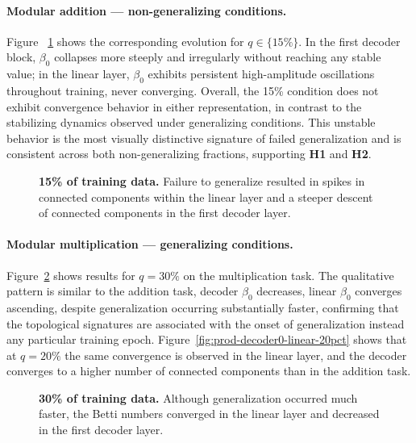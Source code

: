 \paragraph{Modular addition — non-generalizing conditions.}
Figure ~\ref{fig:sum-decoder0-linear-15pct} shows the corresponding evolution for $q \in \{15\%\}$. In the first decoder block, $\beta_0$ collapses more steeply and irregularly without reaching any stable value; in the linear layer, $\beta_0$ exhibits persistent high-amplitude oscillations throughout training, never converging. Overall, the 15\% condition does not exhibit convergence behavior in either representation, in contrast to the stabilizing dynamics observed under generalizing conditions. This unstable behavior is the most visually distinctive signature of failed generalization and is consistent across both non-generalizing fractions, supporting \textbf{H1} and \textbf{H2}.


\begin{figure}
	\centering
	
	
	\caption[15\% of training data.]{\textbf{15\% of training data.} Failure to generalize resulted in spikes in connected components within the linear layer and a steeper descent of connected components in the first decoder layer.}
	\label{fig:sum-decoder0-linear-15pct}
\end{figure}

\paragraph{Modular multiplication — generalizing conditions.}
Figure~\ref{fig:prod-decoder0-linear-30pct} shows results for $q = 30\%$ on the multiplication task. The qualitative pattern is similar to the addition task,  decoder $\beta_0$ decreases, linear $\beta_0$ converges ascending, despite generalization occurring substantially faster, confirming that the topological signatures are associated with the onset of generalization instead any particular training epoch. Figure~\ref{fig:prod-decoder0-linear-20pct} shows that at $q = 20\%$ the same convergence is observed in the linear layer, and the decoder converges to a higher number of connected components than in the addition task.

\begin{figure}
	\centering
	
	
	\caption[30\% of training data (Modular Product).]{\textbf{30\% of training data.} Although generalization occurred much faster, the Betti numbers converged in the linear layer and decreased in the first decoder layer.}
	\label{fig:prod-decoder0-linear-30pct}
\end{figure}

